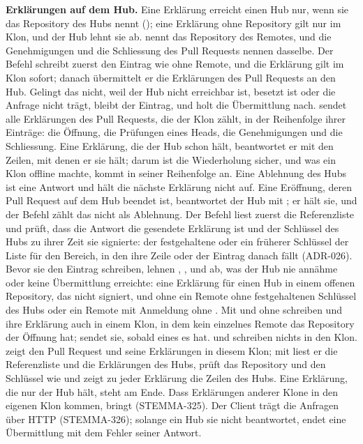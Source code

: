 {\bf Erklärungen auf dem Hub.} Eine Erklärung erreicht einen Hub nur, wenn sie das Repository
des Hubs nennt (); eine Erklärung ohne Repository gilt nur im Klon, und der
Hub lehnt sie ab.  nennt das Repository des Remotes, und die Genehmigungen und
die Schliessung des Pull Requests nennen dasselbe. Der Befehl schreibt zuerst den Eintrag wie
ohne Remote, und die Erklärung gilt im Klon sofort; danach übermittelt er die Erklärungen des
Pull Requests an den Hub. Gelingt das nicht, weil der Hub nicht erreichbar ist, besetzt ist oder
die Anfrage nicht trägt, bleibt der Eintrag, und  holt die Übermittlung nach.
 sendet alle Erklärungen des Pull Requests, die der Klon zählt, in der Reihenfolge
ihrer Einträge: die Öffnung, die Prüfungen eines Heads, die Genehmigungen und die Schliessung.
Eine Erklärung, die der Hub schon hält, beantwortet er mit den Zeilen, mit denen er sie hält;
darum ist die Wiederholung sicher, und was ein Klon offline machte, kommt in seiner Reihenfolge
an. Eine Ablehnung des Hubs ist eine Antwort und hält die nächste Erklärung nicht auf. Eine
Eröffnung, deren Pull Request auf dem Hub beendet ist, beantwortet der Hub mit ;
er hält sie, und der Befehl zählt das nicht als Ablehnung. Der Befehl liest zuerst die
Referenzliste und prüft, dass die Antwort die gesendete Erklärung ist und der Schlüssel des Hubs
zu ihrer Zeit sie signierte: der festgehaltene oder ein früherer Schlüssel der Liste für den
Bereich, in den ihre Zeile  oder der Eintrag danach fällt (ADR-026).
Bevor sie den Eintrag schreiben, lehnen , ,  und
 ab, was der Hub nie annähme oder keine Übermittlung erreichte: eine
Erklärung für einen Hub in einem offenen Repository, das nicht signiert, und ohne
 ein Remote ohne festgehaltenen Schlüssel des Hubs oder ein Remote mit Anmeldung
ohne . Mit  und ohne  schreiben  und
 ihre Erklärung auch in einem Klon, in dem kein einzelnes Remote das Repository
der Öffnung hat;  sendet sie, sobald eines es hat.
 und  schreiben nichts in den Klon.
 zeigt den Pull Request und seine Erklärungen in diesem Klon; mit 
liest er die Referenzliste und die Erklärungen des Hubs, prüft das Repository und den Schlüssel
wie  und zeigt zu jeder Erklärung die Zeilen des Hubs. Eine Erklärung, die nur der
Hub hält, steht am Ende. Dass Erklärungen anderer Klone in den eigenen Klon kommen, bringt
 (STEMMA-325). Der Client trägt die Anfragen über HTTP (STEMMA-326); solange ein Hub
sie nicht beantwortet, endet eine Übermittlung mit dem Fehler seiner Antwort.

